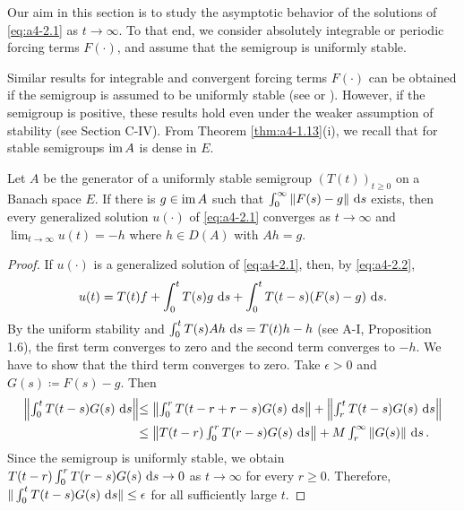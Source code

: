 
Our aim in this section is to study the asymptotic behavior of the solutions of \eqref{eq:a4-2.1} as $t \to \infty$. 
To that end, we consider absolutely integrable or periodic forcing terms $F(\cdot)$, and assume that the semigroup
is uniformly stable.


Similar results for integrable and convergent forcing terms $F(\cdot)$ can
be obtained if the semigroup is assumed to be uniformly  
stable (see \citet[p.119]{pazy:1983} or \citet{neubrander:1985b}). 
However, if the
semigroup is positive, these results hold even under the weaker assumption of stability (see Section C-IV).
From Theorem \ref{thm:a4-1.13}(i), we recall that for stable
semigroups $\mathop{}\!\mathrm{im}\, A$ is dense in $E$.

\begin{theorem}\label{thm:a4-2.1}
Let $A$ be the generator of a uniformly stable semigroup
$(T(t))_{t \geq 0}$ on a Banach space $E$. 
If there is $g \in \mathop{}\!\mathrm{im}\, A$ such that
$\int_{0}^{\infty} \|F(s) - g\| \,\mathop{}\!\mathrm{d}{s}$ exists, then every generalized solution $u(\cdot)$ of
\eqref{eq:a4-2.1} converges as $t \to \infty$ and $\lim_{t \to \infty} u(t) = -h$ where $h \in D(A)$ with
$Ah = g$.
\end{theorem}

\begin{proof}
If $u(\cdot)$ is a generalized solution of \eqref{eq:a4-2.1}, then, by \eqref{eq:a4-2.2},
\[
u(t) = T(t)f + \int_{0}^{t} T(s)g \,\mathop{}\!\mathrm{d}{s} + \int_{0}^{t} T(t-s)(F(s)-g) \,\mathop{}\!\mathrm{d}{s}.
\]
By the uniform
stability and $\int_0^t T(s)Ah\,\mathop{}\!\mathrm{d}{s} = T(t)h - h$ (see A-I, Proposition 1.6), the first term converges to zero
and the second term converges to $-h$. 
We have to show that the
third term converges to zero. 
Take $\epsilon > 0$ and $G(s) \coloneqq F(s)-g$. 
Then
\begin{align*}\textstyle 
\left\|\int_{0}^{t} T(t-s)G(s) \,\mathop{}\!\mathrm{d}{s}\right\| & 
\textstyle{\leq \left\|\int_{0}^{r} T(t-r+r-s)G(s) \,\mathop{}\!\mathrm{d}{s}\right\| + \left\|\int_{r}^{t} T(t-s)G(s) \,\mathop{}\!\mathrm{d}{s}\right\|}\\
& 
\textstyle{\leq \left\|T(t-r)\int_{0}^{r} T(r-s)G(s) \,\mathop{}\!\mathrm{d}{s}\right\| + M \int_{r}^{\infty} \|G(s)\| \,\mathop{}\!\mathrm{d}{s}\,.}
\end{align*}
Since the semigroup is uniformly stable, we obtain
$T(t-r)\int_{0}^{r} T(r-s)G(s) \,\mathop{}\!\mathrm{d}{s} \to 0$ as $t \to \infty$ for every $r \geq 0$.
Therefore, $\|\int_{0}^{t} T(t-s)G(s) \,\mathop{}\!\mathrm{d}{s}\| \leq \epsilon$ for all sufficiently large $t$.
\end{proof}


